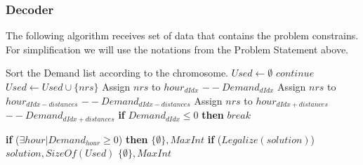 \documentclass{article}
\newcommand\tab[1][1cm]{\hspace*{#1}}
\begin{document}
		\subsubsection{Decoder}
			\tab The following algorithm receives set of data that contains the problem constrains. For simplification we will use the notations from the Problem Statement above.
		\begin{algorithmic}[1]
			\State Sort the Demand list according to the chromosome. \label{sort}
			\State $Used \leftarrow \emptyset$
				    \State $continue$
			    \EndIf
				        \State $Used \leftarrow Used \cup \{nrs\}$
		    		    \State Assign $nrs$ to $hour_{dIdx}$
		    		    \State $--Demand_{dIdx}$
		    		     \label{neighbors}
		    		    \State {}
		    		            \State Assign $nrs$ to $hour_{dIdx-distances}$
		    		            \State $--Demand_{dIdx-distances}$
		    		        \EndIf
		    		            \State Assign $nrs$ to $hour_{dIdx+distances}$
		    		            \State $--Demand_{dIdx+distances}$
		    		        \EndIf
		    		    \EndFor {}
			        \EndIf
			        \State \textbf{if} {$Demand_{dIdx} \leq 0 $} \textbf{then} \textbf{$break$}
			    \EndFor 
			    \State {}
		    \EndFor {}

		\State \textbf{if} ($\exists hour | Demand_{hour} \ge 0  $) \textbf{then}
		    \State \tab \Return $\{\emptyset\}, MaxInt$
		\State \textbf{if} ($Legalize(solution)$) 
		    \State \tab \Return $solution, SizeOf(Used)$
		\State \Return $\{\emptyset\}, MaxInt$
		\EndFunction
		\end{algorithmic}
\end{document}
